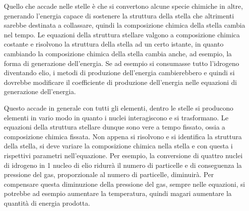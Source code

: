 
Quello che accade nelle stelle è che si convertono alcune specie chimiche in altre, generando l'energia capace di sostenere la struttura della stella che altrimenti sarebbe destinata a collassare, quindi la composizione chimica della stella cambia nel tempo. Le equazioni della struttura stellare valgono a composizione chimica costante e risolvono la struttura della stella ad un certo istante, in quanto cambiando la composizione chimica della stella cambia anche, ad esempio, la forma di generazione dell'energia. Se ad esempio si consumasse tutto l'idrogeno diventando elio, i metodi di produzione dell'energia cambierebbero e quindi si dovrebbe modificare il coefficiente di produzione dell'energia nelle equazioni di generazione dell'energia.

Questo accade in generale con tutti gli elementi, dentro le stelle si producono elementi in vario modo in quanto i nuclei interagiscono e si trasformano. Le equazioni della struttura stellare dunque sono vere a tempo fissato, ossia a composizione chimica fissata. Non appena si risolvono e si identifica la struttura della stella, si deve variare la composizione chimica nella stella e con questa i rispettivi parametri nell'equazione. Per esempio, la conversione di quattro nuclei di idrogeno in 1 nucleo di elio ridurrà il numero di particelle e di conseguenza la pressione del gas, proporzionale al numero di particelle, diminuirà. Per compensare questa diminuzione della pressione del gas, sempre nelle equazioni, si potrebbe ad esempio aumentare la temperatura, quindi magari aumentare la quantità di energia prodotta.

